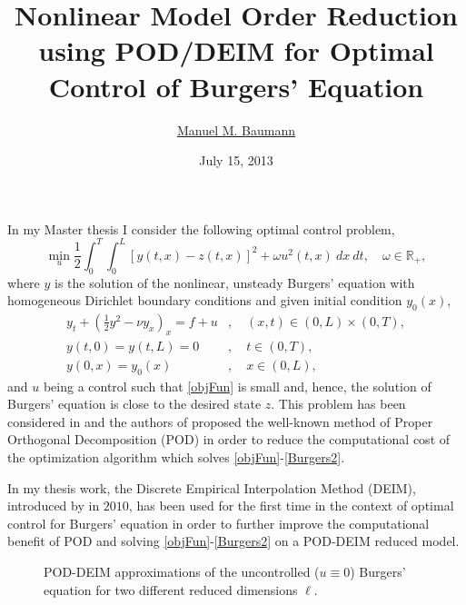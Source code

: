 \documentclass[a4paper,10pt]{article}
\title{\textbf{Nonlinear Model Order Reduction using POD/DEIM for Optimal Control of Burgers' Equation}}
\author{\href{mailto:manuelmbaumann@gmail.com}{Manuel M. Baumann}}
\date{July 15, 2013}
\begin{document}
\maketitle

\noindent
In my Master thesis I consider the following optimal control problem,
\begin{equation}
\label{objFun}
\min_u \frac{1}{2} \int_0^T \int_0^L [y(t,x) - z(t,x)]^2 + \omega u^2(t,x) \ dx \ dt, \quad \omega \in \mathbb{R}_+,
\end{equation}
where $y$ is the solution of the nonlinear, unsteady Burgers' equation with homogeneous Dirichlet boundary conditions and given initial condition $y_0(x)$,
\begin{equation}
\label{Burgers2}
\begin{split}
y_t + \left( \frac{1}{2}y^2 - \nu y_x\right)_x = f + u&, \quad (x,t) \in (0,L) \times (0,T), \\
y(t,0) = y(t,L) = 0&, \quad t \in (0,T), \\
y(0,x) = y_0(x)&, \quad x \in (0,L),
\end{split}
\end{equation}
and $u$ being a control such that \eqref{objFun} is small and, hence, the solution of Burgers' equation is close to the desired state $z$. This problem has been considered in \cite{H08} and the authors of \cite{KV99} proposed the well-known method of Proper Orthogonal Decomposition (POD) in order to reduce the computational cost of the optimization algorithm which solves \eqref{objFun}-\eqref{Burgers2}.

In my thesis work, the Discrete Empirical Interpolation Method (DEIM), introduced by \cite{DEIM} in $2010$, has been used for the first time in the context of optimal control for Burgers' equation in order to further improve the computational benefit of POD and solving \eqref{objFun}-\eqref{Burgers2} on a POD-DEIM reduced model.
\begin{figure}[h!]
\centering
\caption{POD-DEIM approximations of the uncontrolled ($u \equiv 0$) Burgers' equation for two different reduced dimensions $\ell$.}\label{PODplot}
\end{figure}

\newpage


\end{document}
